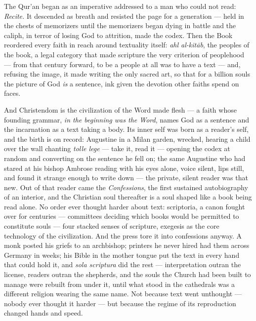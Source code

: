 The Qur'an began as an imperative addressed to a man who could not read:
\emph{Recite.} It descended as breath and resisted the page for a
generation --- held in the chests of memorizers until the memorizers
began dying in battle and the caliph, in terror of losing God to
attrition, made the codex. Then the Book reordered every faith in reach
around textuality itself: \emph{ahl al-kitāb}, the peoples of the book,
a legal category that made scripture the very criterion of peoplehood
--- from that century forward, to be a people at all was to have a text
--- and, refusing the image, it made writing the only sacred art, so
that for a billion souls the picture of God \emph{is} a sentence, ink
given the devotion other faiths spend on faces.

And Christendom is the civilization of the Word made flesh --- a faith
whose founding grammar, \emph{in the beginning was the Word}, names God
as a sentence and the incarnation as a text taking a body. Its inner
self was born as a reader's self, and the birth is on record: Augustine
in a Milan garden, wrecked, hearing a child over the wall chanting
\emph{tolle lege} --- take it, read it --- opening the codex at random
and converting on the sentence he fell on; the same Augustine who had
stared at his bishop Ambrose reading with his eyes alone, voice silent,
lips still, and found it strange enough to write down --- the private,
silent reader was that new. Out of that reader came the
\emph{Confessions}, the first sustained autobiography of an interior,
and the Christian soul thereafter is a soul shaped like a book being
read alone. No order ever thought harder about text: scriptoria, a canon
fought over for centuries --- committees deciding which books would be
permitted to constitute souls --- four stacked senses of scripture,
exegesis as the core technology of the civilization. And the press tore
it into confessions anyway. A monk posted his griefs to an archbishop;
printers he never hired had them across Germany in weeks; his Bible in
the mother tongue put the text in every hand that could hold it, and
\emph{sola scriptura} did the rest --- interpretation outran the
license, readers outran the shepherds, and the souls the Church had been
built to manage were rebuilt from under it, until what stood in the
cathedrals was a different religion wearing the same name. Not because
text went unthought --- nobody ever thought it harder --- but because
the regime of its reproduction changed hands and speed.

